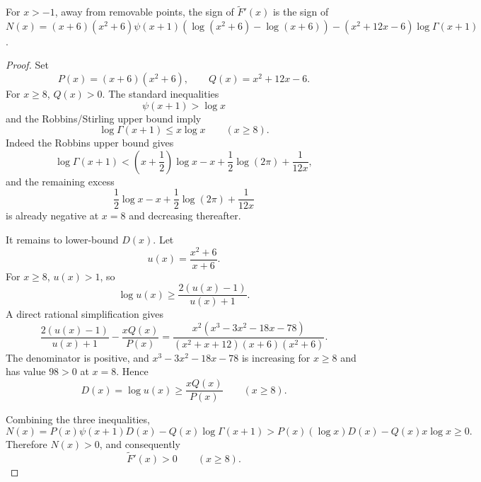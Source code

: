 \begin{proposition}
\label{res:bz-gamma-quotient-derivative-normal-form}
For \(x>-1\), away from removable points, the sign of \(\widetilde F'(x)\) is the sign of \(N(x)=(x+6)(x^2+6)\psi(x+1)(\log(x^2+6)-\log(x+6))-(x^2+12x-6)\log\Gamma(x+1)\).
\end{proposition}
\begin{proof}
Set
\[
P(x)=(x+6)(x^2+6),\qquad Q(x)=x^2+12x-6.
\]
For \(x\ge8\), \(Q(x)>0\). The standard inequalities
\[
\psi(x+1)>\log x
\]
and the Robbins/Stirling upper bound imply
\[
\log\Gamma(x+1)\le x\log x
\qquad (x\ge8).
\]
Indeed the Robbins upper bound gives
\[
\log\Gamma(x+1)
<
\left(x+\frac12\right)\log x-x+\frac12\log(2\pi)+\frac1{12x},
\]
and the remaining excess
\[
\frac12\log x-x+\frac12\log(2\pi)+\frac1{12x}
\]
is already negative at \(x=8\) and decreasing thereafter.

It remains to lower-bound \(D(x)\). Let
\[
u(x)=\frac{x^2+6}{x+6}.
\]
For \(x\ge8\), \(u(x)>1\), so
\[
\log u(x)\ge \frac{2(u(x)-1)}{u(x)+1}.
\]
A direct rational simplification gives
\[
\frac{2(u(x)-1)}{u(x)+1}
-\frac{xQ(x)}{P(x)}
=
\frac{x^2(x^3-3x^2-18x-78)}
{(x^2+x+12)(x+6)(x^2+6)}.
\]
The denominator is positive, and \(x^3-3x^2-18x-78\) is increasing for \(x\ge8\) and has value \(98>0\) at \(x=8\). Hence
\[
D(x)=\log u(x)\ge \frac{xQ(x)}{P(x)}
\qquad (x\ge8).
\]

Combining the three inequalities,
\[
N(x)
=P(x)\psi(x+1)D(x)-Q(x)\log\Gamma(x+1)
>
P(x)(\log x)D(x)-Q(x)x\log x
\ge0.
\]
Therefore \(N(x)>0\), and consequently
\[
\widetilde F'(x)>0
\qquad (x\ge8).
\]
\end{proof}

